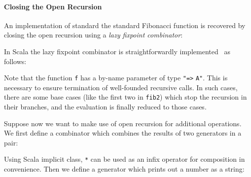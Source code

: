 \paragraph{Closing the Open Recursion} An implementation of
 standard the standard Fibonacci function is recovered by closing 
the open recursion using a \emph{lazy fixpoint combinator}:

In Scala the lazy fixpoint combinator is straightforwardly implemented~\cite{} as follows:

\noindent Note that the function \lstinline{f} has a by-name parameter 
of type \lstinline{"=>} \lstinline{A"}. This is necessary to ensure
termination of well-founded recursive calls. In such cases, 
there are some base cases (like the first two in
\lstinline{fib2}) which stop the recursion in their branches, and the 
evaluation is finally reduced to those cases.

\begin{comment} 
If we close the recursion on \lstinline{fib2} only, the evaluation of \lstinline{fix(fib2)(2)}, namely the above \lstinline{x2} is processed as follows:
\begin{lstlisting}[language=Haskell,keywords={}]
   fix(fib2)(2)
= lazy val a = fib2(a); a.apply(2)
= lazy val a = fib2(a); fib2(a)(2)
= ... (the third case in fib2)
= lazy val a = fib2(a); a.apply(1) + a.apply(0)
= lazy val a = fib2(a); fib2(a)(1) + fib2(a)(0)
= ... (the first two cases in fib2)
= lazy val a = fib2(a); 1 + 0
= 1
\end{lstlisting}
which behaves similarly as \lstinline{fib(2)}. The process of evaluation will terminate if there are some base cases (like the first two in
\lstinline{fib2}) which stop the recursion in their branches, and the evaluation is finally reduced to those cases.
\end{comment}

Suppose now we want to make use of open recursion for additional operations. We first define a combinator which combines the results of two generators in a pair:

Using Scala implicit class, \lstinline{*} can be used as an infix operator for composition in convenience.
Then we define a generator which prints out a number as a string:

